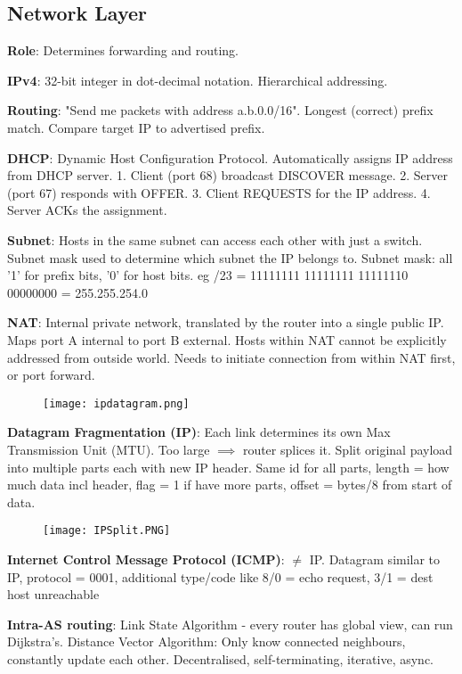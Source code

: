 \documentclass[a4paper,landscape]{article}
\newcommand{\rntopic}[1]{\vspace{-2.0em}\subsection*{#1}\vspace{-1.0em}}
\newcommand{\rnname}[1]{\textbf{#1}}
\begin{document}
\begin{multicols*}{4}
\rntopic{Network Layer}
\begin{flatitemize}
\item \rnname{Role}: Determines forwarding and routing.
\item \rnname{IPv4}: 32-bit integer in dot-decimal notation. Hierarchical addressing.
\item \rnname{Routing}: "Send me packets with address a.b.0.0/16". Longest (correct) prefix match. Compare target IP to advertised prefix. 
\item \rnname{DHCP}: Dynamic Host Configuration Protocol. Automatically assigns IP address from DHCP server. 1. Client (port 68) broadcast DISCOVER message. 2. Server (port 67) responds with OFFER. 3. Client REQUESTS for the IP address. 4. Server ACKs the assignment. 
\item \rnname{Subnet}: Hosts in the same subnet can access each other with just a switch. Subnet mask used to determine which subnet the IP belongs to. Subnet mask: all '1' for prefix bits, '0' for host bits. eg /23 = 11111111 11111111 11111110 00000000 = 255.255.254.0
\item \rnname{NAT}: Internal private network, translated by the router into a single public IP. Maps port A internal to port B external. Hosts within NAT cannot be explicitly addressed from outside world. Needs to initiate connection from within NAT first, or port forward.
\vspace{-0.3cm}
    \begin{figure}[H]
      \texttt{[image: ipdatagram.png]}
    \end{figure}
\vspace{-0.4cm}
\item \rnname{Datagram Fragmentation (IP)}: Each link determines its own Max Transmission Unit (MTU). Too large $\implies$ router splices it. Split original payload into multiple parts each with new IP header. Same id for all parts, length = how much data incl header, flag = 1 if have more parts, offset = bytes/8 from start of data.
\vspace{-0.3cm}
    \begin{figure}[H]
      \texttt{[image: IPSplit.PNG]}
    \end{figure}
\vspace{-0.4cm}
\item \rnname{Internet Control Message Protocol (ICMP)}: $\neq$ IP. Datagram similar to IP, protocol = 0001, additional type/code like 8/0 = echo request, 3/1 = dest host unreachable 
\item \rnname{Intra-AS routing}: Link State Algorithm - every router has global view, can run Dijkstra's. Distance Vector Algorithm: Only know connected neighbours, constantly update each other. Decentralised, self-terminating, iterative, async.

\end{flatitemize}
\end{multicols*}
\end{document}
